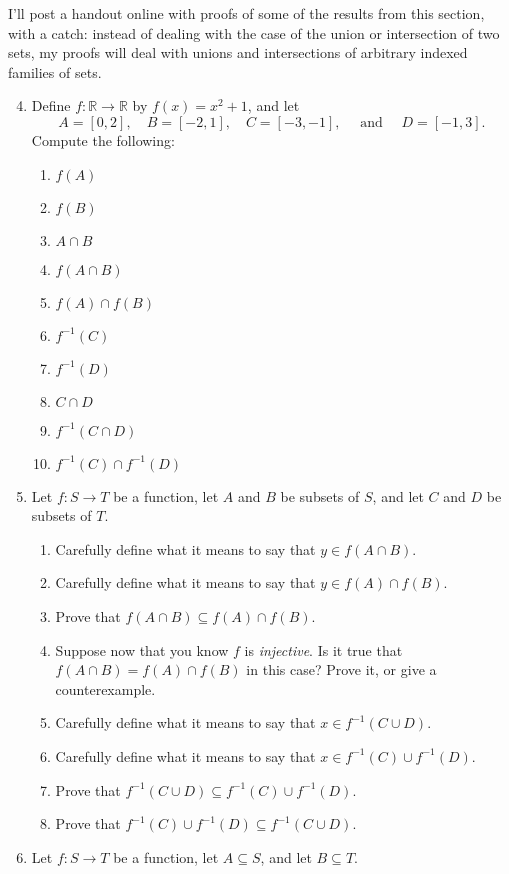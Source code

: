 \documentclass[letterpaper,12pt]{article}
\begin{document}
I'll post a handout online with proofs of some of the results from this section, with a catch: instead of dealing with the case of the union or intersection of two sets, my proofs will deal with unions and intersections of arbitrary indexed families of sets.

\newpage

\begin{enumerate}\setcounter{enumi}{3}
 \item Define $f:\mathbb{R}\to\mathbb{R}$ by $f(x) = x^2+1$, and let
\[
 A = [0,2],\quad B = [-2,1], \quad C = [-3,-1], \quad \text{ and } \quad D = [-1,3].
\]
Compute the following:
\begin{enumerate}
 \item $f(A)$
 \item $f(B)$
 \item $A\cap B$
 \item $f(A\cap B)$
 \item $f(A)\cap f(B)$
 \item $f^{-1}(C)$
 \item $f^{-1}(D)$
 \item $C\cap D$
 \item $f^{-1}(C\cap D)$
 \item $f^{-1}(C)\cap f^{-1}(D)$
\end{enumerate}
 \item Let $f:S\to T$ be a function, let $A$ and $B$ be subsets of $S$, and let $C$ and $D$ be subsets of $T$.
\begin{enumerate}
 \item Carefully define what it means to say that $y\in f(A\cap B)$.
 \item Carefully define what it means to say that $y\in f(A)\cap f(B)$.
 \item Prove that $f(A\cap B)\subseteq f(A)\cap f(B)$.
 \item Suppose now that you know $f$ is \textit{injective}. Is it true that $f(A\cap B)=f(A)\cap f(B)$ in this case? Prove it, or give a counterexample.
 \item Carefully define what it means to say that $x\in f^{-1}(C\cup D)$.
 \item Carefully define what it means to say that $x\in f^{-1}(C)\cup f^{-1}(D)$.
 \item Prove that $f^{-1}(C\cup D)\subseteq f^{-1}(C)\cup f^{-1}(D)$.
 \item Prove that $f^{-1}(C)\cup f^{-1}(D) \subseteq f^{-1}(C\cup D)$.
\end{enumerate}
 \item Let $f:S\to T$ be a function, let $A\subseteq S$, and let $B\subseteq T$.

\end{enumerate}
\end{document}
